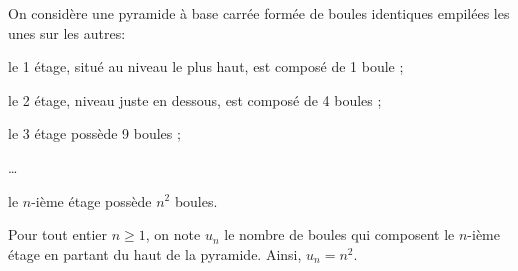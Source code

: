 \medskip

On considère une pyramide à base carrée formée de boules identiques empilées les unes sur les autres:

\begin{list}{\textbullet}{}
\item le 1 étage, situé au niveau le plus haut, est composé de 1 boule ;
\item le 2 étage, niveau juste en dessous, est composé de 4 boules ;
\item le 3 étage possède 9 boules ;
\item \ldots
\item le $n$-ième étage possède $n^2$ boules.
\end{list}

\medskip

Pour tout entier $n \geqslant 1$, on note $u_n$ le nombre de boules qui composent le $n$-ième étage en partant du haut de la pyramide. Ainsi, $u_n = n^2$.

